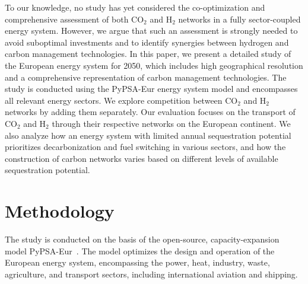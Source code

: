 \documentclass[twocolumn]{article}
\newcommand{\COtwo}{CO$_2$}
\newcommand{\Htwo}{H$_2$}
\begin{document}
To our knowledge, no study has yet considered the co-optimization and comprehensive assessment of both \COtwo{} and \Htwo{} networks in a fully sector-coupled energy system. However, we argue that such an assessment is strongly needed to avoid suboptimal investments and to identify synergies between hydrogen and carbon management technologies. In this paper, we present a detailed study of the European energy system for 2050, which includes high geographical resolution and a comprehensive representation of carbon management technologies. The study is conducted using the PyPSA-Eur energy system model and encompasses all relevant energy sectors. We explore competition between \COtwo{} and \Htwo{} networks by adding them separately. Our evaluation focuses on the transport of \COtwo{} and \Htwo{} through their respective networks on the European continent. We also analyze how an energy system with limited annual sequestration potential prioritizes decarbonization and fuel switching in various sectors, and how the construction of carbon networks varies based on different levels of available sequestration potential.


\section{Methodology}
\label{sec:methodology}

The study is conducted on the basis of the open-source, capacity-expansion model PyPSA-Eur~\cite{horschPyPSAEurOpenOptimisation2018,brownSynergiesSectorCoupling2018,PyPSAEurSecSectorCoupledOpen2023}.
The model optimizes the design and operation of the European energy system, encompassing the power, heat, industry, waste, agriculture, and transport sectors, including international aviation and shipping.
\end{document}
